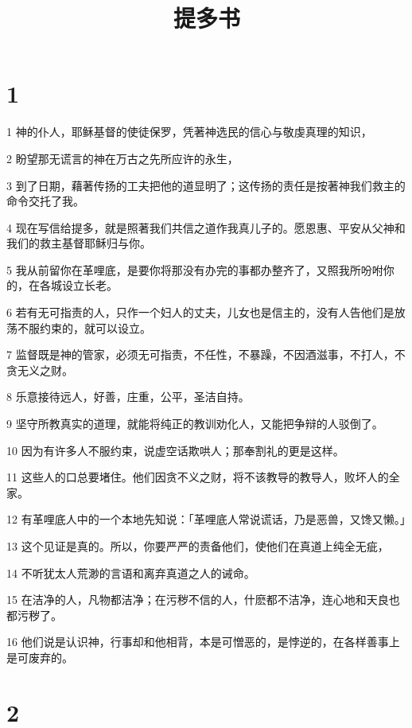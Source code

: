 

\title{提多书}


\chapter{1}

\par 1 神的仆人，耶稣基督的使徒保罗，凭著神选民的信心与敬虔真理的知识，
\par 2 盼望那无谎言的神在万古之先所应许的永生，
\par 3 到了日期，藉著传扬的工夫把他的道显明了；这传扬的责任是按著神我们救主的命令交托了我。
\par 4 现在写信给提多，就是照著我们共信之道作我真儿子的。愿恩惠、平安从父神和我们的救主基督耶稣归与你。
\par 5 我从前留你在革哩底，是要你将那没有办完的事都办整齐了，又照我所吩咐你的，在各城设立长老。
\par 6 若有无可指责的人，只作一个妇人的丈夫，儿女也是信主的，没有人告他们是放荡不服约束的，就可以设立。
\par 7 监督既是神的管家，必须无可指责，不任性，不暴躁，不因酒滋事，不打人，不贪无义之财。
\par 8 乐意接待远人，好善，庄重，公平，圣洁自持。
\par 9 坚守所教真实的道理，就能将纯正的教训劝化人，又能把争辩的人驳倒了。
\par 10 因为有许多人不服约束，说虚空话欺哄人；那奉割礼的更是这样。
\par 11 这些人的口总要堵住。他们因贪不义之财，将不该教导的教导人，败坏人的全家。
\par 12 有革哩底人中的一个本地先知说：「革哩底人常说谎话，乃是恶兽，又馋又懒。」
\par 13 这个见证是真的。所以，你要严严的责备他们，使他们在真道上纯全无疵，
\par 14 不听犹太人荒渺的言语和离弃真道之人的诫命。
\par 15 在洁净的人，凡物都洁净；在污秽不信的人，什麽都不洁净，连心地和天良也都污秽了。
\par 16 他们说是认识神，行事却和他相背，本是可憎恶的，是悖逆的，在各样善事上是可废弃的。

\chapter{2}

